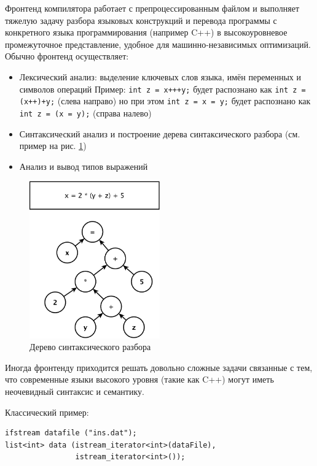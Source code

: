 \documentclass[a4paper,12pt,oneside]{article}
\begin{document}
Фронтенд компилятора работает с препроцессированным файлом и выполняет тяжелую задачу разбора языковых конструкций и перевода программы с конкретного языка программирования (например C++) в высокоуровневое промежуточное представление, удобное для машинно-независимых оптимизаций. Обычно фронтенд осуществляет:

\begin{itemize}
\item Лексический анализ: выделение ключевых слов языка, имён переменных и символов операций
Пример: \lstinline!int z = x+++y;! будет распознано как \lstinline!int z = (x++)+y;! (слева направо) но при этом \lstinline!int z = x = y;! будет распознано как \lstinline!int z = (x = y);! (справа налево)
\item Синтаксический анализ и построение дерева синтаксического разбора (см. пример на рис. \ref{fig:ast_scheme})
\item Анализ и вывод типов выражений
\end{itemize}

\begin{figure}[ht]
\centering
\includegraphics[width=0.5\textwidth]{illustrations/ast-example-crop.pdf}
\caption{Дерево синтаксического разбора}
\label{fig:ast_scheme}
\end{figure}

Иногда фронтенду приходится решать довольно сложные задачи связанные с тем, что современные языки высокого уровня (такие как C++) могут иметь неочевидный синтаксис и семантику.

Классический пример:

\begin{lstlisting}
ifstream datafile ("ins.dat");
list<int> data (istream_iterator<int>(dataFile),
                istream_iterator<int>());
\end{lstlisting}
\end{document}

